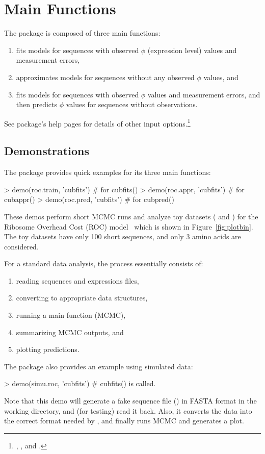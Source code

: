 
\section[Main Functions]{Main Functions}
\label{sec:main_functions}

The  package is composed of three main functions:
\begin{enumerate}
\item {} fits models for sequences with observed $\phi$ 
      (expression level) values and measurement errors,
\item {} approximates models for sequences without any observed
      $\phi$ values, and
\item {} fits models for sequences with observed $\phi$ values
      and measurement errors, and then predicts $\phi$ values for sequences
      without observations.
\end{enumerate}
See package's help pages for details of other input options.\footnote{
, , and
.
}


\subsection[Demonstrations]{Demonstrations}
\label{sec:demonstrtions}

The  package provides quick examples for its three main functions:
\begin{Code}
> demo(roc.train, 'cubfits')    # for cubfits()
> demo(roc.appr, 'cubfits')     # for cubappr()
> demo(roc.pred, 'cubfits')     # for cubpred()
\end{Code}
These  demos perform short MCMC runs
and analyze toy datasets ( and ) for the
Ribosome Overhead Cost (ROC) model~\citep{Shah2011}
which is shown in Figure~\ref{fig:plotbin}. The toy datasets have only 100
short sequences, and only 3 amino acids are considered.

For a standard data analysis, the process essentially consists of:
\begin{enumerate}
\item reading sequences and expressions files,
\item converting to appropriate data structures,
\item running a main function (MCMC),
\item summarizing MCMC outputs, and
\item plotting predictions.
\end{enumerate}
The  package also provides an example using simulated data:
\begin{Code}
> demo(simu.roc, 'cubfits')     # cubfits() is called.
\end{Code}
Note that this demo will generate a fake sequence file ()
in FASTA format in the working directory, and (for testing)
read it back. Also, it converts the data into the correct format
needed by , and finally runs MCMC and generates a plot.


